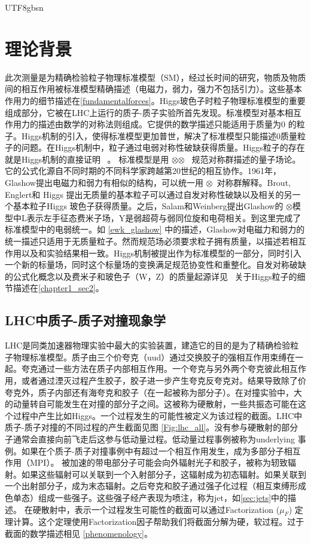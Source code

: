 \begin{CJK}{UTF8}{gbsn}
	\section{理论背景}\label{theory_motivation_chinese}
此次测量是为精确检验粒子物理标准模型（SM），经过长时间的研究，物质及物质间的相互作用被标准模型精确描述（电磁力，弱力，强力不包括引力）。这些基本作用力的细节描述在\ref{fundamentalforces}。Higgs玻色子时粒子物理标准模型的重要组成部分，它被在LHC上运行的质子-质子实验所首先发现。标准模型对基本相互作用力的描述由数学的对称法则组成。它提供的数学描述只能适用于质量为0 的粒子。Higgs机制的引入，使得标准模型更加普世，解决了标准模型只能描述0质量粒子的问题。在Higgs机制中，粒子通过电弱对称性破缺获得质量。Higgs粒子的存在就是Higgs机制的直接证明 ~\cite{Reference7,Reference8,Reference9,Reference10,Reference11,Reference12}。
标准模型是用 \suthreec$\otimes$\sutwol$\otimes$\uoneg~ 规范对称群描述的量子场论。它的公式化源自不同时期的不同科学家跨越第20世纪的相互协作。1961年，Glashow提出电磁力和弱力有相似的结构，可以统一用 \sutwol$\otimes$\uoneg ~对称群解释。Brout, Englert和 Higgs 提出无质量的基本粒子可以通过自发对称性破缺以及相关的另一个基本粒子Higgs 玻色子获得质量。之后，Salam和Weinberg提出Glashow的 \sutwol$\otimes$\uoneg 模型中L表示左手征态费米子场，Y是弱超荷与弱同位旋和电荷相关。到这里完成了标准模型中的电弱统一。如 \ref{ewk_glashow} 中的描述，Glashow对电磁力和弱力的统一描述只适用于无质量粒子。然而规范场必须要求粒子拥有质量，以描述若相互作用以及和实验结果相一致。Higgs机制被提出作为标准模型的一部分，同时引入一个新的标量场，同时这个标量场的变换满足规范协变性和重整化。自发对称破缺的公式化概念以及费米子和玻色子（W，Z）的质量起源详见 ~\cite{Reference7,Reference8,Reference9,Reference10,Reference11,Reference12}关于Higgs粒子的细节描述在\ref{chapter1_sec2}。
	\subsection{LHC中质子-质子对撞现象学} \label{lhc_pheno_chinese}
	LHC是同类加速器物理实验中最大的实验装置，建造它的目的是为了精确检验粒子物理标准模型。质子由三个价夸克（uud）通过交换胶子的强相互作用束缚在一起。夸克通过一些方法在质子内部相互作用。一个夸克与另外两个夸克彼此相互作用，或者通过湮灭过程产生胶子，胶子进一步产生夸克反夸克对。结果导致除了价夸克外，质子内部还有海夸克和胶子（在一起被称为部分子）。在对撞实验中，大的动量转自可能发生在对撞的部分子之间。这被称为硬散射，一些共振态可能在这个过程中产生比如Higgs。一个过程发生的可能性被定义为该过程的截面。LHC中质子-质子对撞的不同过程的产生截面见图 \ref{Fig:lhc_all}。没有参与硬散射的部分子通常会直接向前飞走后这参与低动量过程。低动量过程事例被称为underlying 事例。如果在个质子-质子对撞事例中有超过一个相互作用发生，成为多部分子相互作用（MPI）。
被加速的带电部分子可能会向外辐射光子和胶子，被称为轫致辐射。如果这些辐射可以关联到一个入射部分子，这辐射成为初态辐射。如果关联到一个出射部分子，成为末态辐射。之后夸克和胶子通过强子化过程（相互束缚形成色单态）组成一些强子。这些强子经产表现为喷注，称为jet，如\ref{sec:jets}中的描述。
在硬散射中，表示一个过程发生可能性的截面可以通过Factorization ($\mu_{F}$) 定理计算。这个定理使用Factorization因子帮助我们将截面分解为硬，软过程。过于截面的数学描述相见 \ref{phenomenology}。


\end{CJK}
